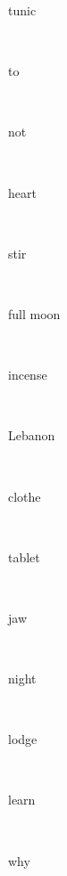 \documentclass[a4paper]{article}
\begin{document}
\begin{multicols}{4}
\begin{multicols}{4}
\begin{multicols}{5}
{\hebrewfont{}} \begin{english}tunic\end{english}\\
{\hebrewfont{}} \begin{english}to\end{english}\\
{\hebrewfont{}} \begin{english}not\end{english}\\
{\hebrewfont{}} \begin{english}heart\end{english}\\
{\hebrewfont{}} \begin{english}stir\end{english}\\
{\hebrewfont{}} \begin{english}full moon\end{english}\\
{\hebrewfont{}} \begin{english}incense\end{english}\\
{\hebrewfont{}} \begin{english}Lebanon\end{english}\\
{\hebrewfont{}} \begin{english}clothe\end{english}\\
{\hebrewfont{}} \begin{english}tablet\end{english}\\
{\hebrewfont{}} \begin{english}jaw\end{english}\\
{\hebrewfont{}} \begin{english}night\end{english}\\
{\hebrewfont{}} \begin{english}lodge\end{english}\\
{\hebrewfont{}} \begin{english}learn\end{english}\\
{\hebrewfont{}} \begin{english}why\end{english}\\

\end{multicols}
\end{multicols}
\end{multicols}
\end{document}
